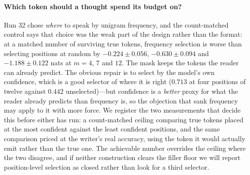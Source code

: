 \documentclass{article} %
\begin{document}
\paragraph{Which token should a thought spend its budget on?} Run 32 chose \emph{where} to speak by
unigram frequency, and the count-matched control says that choice was the weak part of the design
rather than the format: at a matched number of surviving true tokens, frequency selection is worse
than selecting positions at random by $-0.224 \pm 0.056$, $-0.630 \pm 0.094$ and $-1.188 \pm 0.122$
nats at $m{=}4$, $7$ and $12$. The mask keeps the tokens the reader can already predict. The obvious
repair is to select by the model's own confidence, which is a good selector of where it is right
($0.713$ at four positions of twelve against $0.442$ unselected)---but confidence is a
\emph{better} proxy for what the reader already predicts than frequency is, so the objection that sank
frequency may apply to it with more force. We register the two measurements that decide this before
either has run: a count-matched ceiling comparing true tokens placed at the most confident against the
least confident positions, and the same comparison priced at the writer's real accuracy, using the
token it would actually emit rather than the true one. The achievable number overrides the ceiling
where the two disagree, and if neither construction clears the filler floor we will report
position-level selection as closed rather than look for a third selector.
\end{document}
